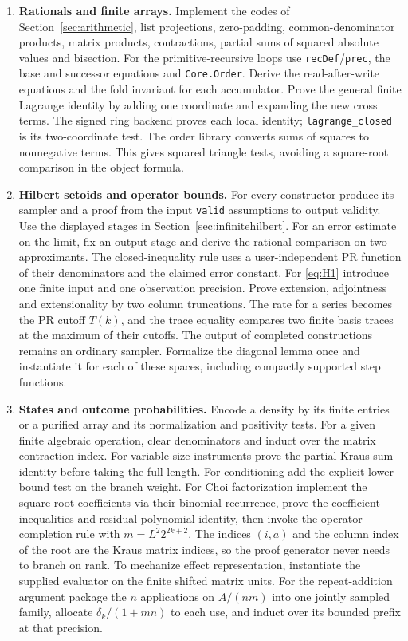 \begin{enumerate}
\item \textbf{Rationals and finite arrays.} Implement the codes of Section~\ref{sec:arithmetic}, list projections, zero-padding, common-denominator products, matrix products, contractions, partial sums of squared absolute values and bisection. For the primitive-recursive loops use \texttt{recDef}/\texttt{prec}, the base and successor equations and \texttt{Core.Order}. Derive the read-after-write equations and the fold invariant for each accumulator. Prove the general finite Lagrange identity by adding one coordinate and expanding the new cross terms. The signed ring backend proves each local identity; \texttt{lagrange\_closed} is its two-coordinate test. The order library converts sums of squares to nonnegative terms. This gives squared triangle tests, avoiding a square-root comparison in the object formula.
\item \textbf{Hilbert setoids and operator bounds.} For every constructor produce its sampler and a proof from the input \texttt{valid} assumptions to output validity. Use the displayed stages in Section~\ref{sec:infinitehilbert}. For an error estimate on the limit, fix an output stage and derive the rational comparison on two approximants. The closed-inequality rule uses a user-independent PR function of their denominators and the claimed error constant. For \eqref{eq:H1} introduce one finite input and one observation precision. Prove extension, adjointness and extensionality by two column truncations. The rate for a series becomes the PR cutoff $T(k)$, and the trace equality compares two finite basis traces at the maximum of their cutoffs. The output of completed constructions remains an ordinary sampler. Formalize the diagonal lemma once and instantiate it for each of these spaces, including compactly supported step functions.
\item \textbf{States and outcome probabilities.} Encode a density by its finite entries or a purified array and its normalization and positivity tests. For a given finite algebraic operation, clear denominators and induct over the matrix contraction index. For variable-size instruments prove the partial Kraus-sum identity before taking the full length. For conditioning add the explicit lower-bound test on the branch weight. For Choi factorization implement the square-root coefficients via their binomial recurrence, prove the coefficient inequalities and residual polynomial identity, then invoke the operator completion rule with $m=L^2 2^{2k+2}$. The indices $(i,a)$ and the column index of the root are the Kraus matrix indices, so the proof generator never needs to branch on rank. To mechanize effect representation, instantiate the supplied evaluator on the finite shifted matrix units. For the repeat-addition argument package the $n$ applications on $A/(nm)$ into one jointly sampled family, allocate $\delta_k/(1+mn)$ to each use, and induct over its bounded prefix at that precision.

\end{enumerate}
